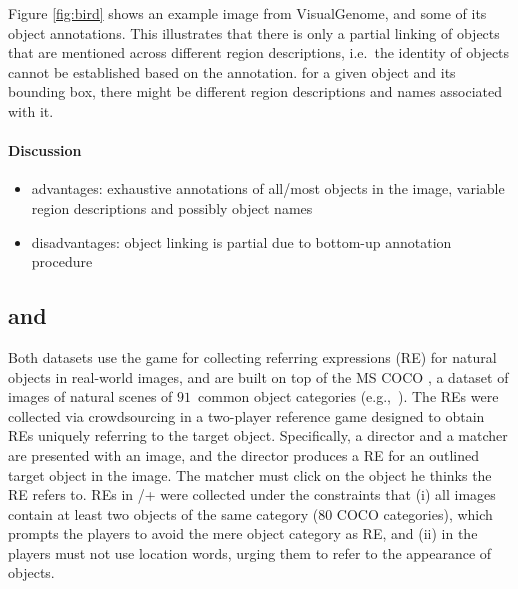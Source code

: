Figure \ref{fig:bird} shows an example image from VisualGenome, and some of its object annotations. This illustrates that there is only a partial linking of objects that are mentioned across different region descriptions, i.e.\ the identity of objects cannot be established based on the annotation. for a given object and its bounding box, there might be different region descriptions and names associated with it.

\paragraph{Discussion}
\begin{itemize}
\item advantages: exhaustive annotations of all/most objects in the image, variable region descriptions and possibly object names
\item disadvantages: object linking is partial due to bottom-up annotation procedure
\end{itemize}

\subsection{ and }
Both datasets use the \cite{Kazemzadeh2014} game for collecting referring expressions (RE) for natural objects in real-world images, and are built on top of the MS COCO \cite{mscoco}, 
a dataset of images of natural scenes of $91$~common object categories (e.g.,~). 
The REs were collected via crowdsourcing in a two-player reference game designed to obtain REs uniquely referring to the target object. 
Specifically, a director and a matcher are presented with an image, and the director produces a RE for an outlined target object in the image. 
The matcher must click on the object he thinks the RE refers to. %
REs in /+ were collected under the constraints that (i) all images contain at least two objects of the same category (80 COCO categories), which prompts the players to avoid the mere object category as RE, and (ii) in  the players must not use location words, urging them to refer to the appearance of objects. 


